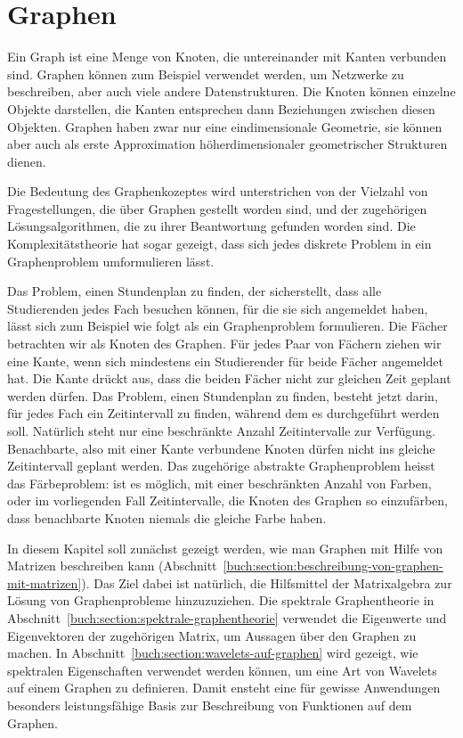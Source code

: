 %
%
%
\chapter{Graphen
\label{buch:chapter:graphen}}
\rhead{}
Ein Graph ist eine Menge von Knoten, die untereinander mit Kanten
verbunden sind.
%
Graphen können zum Beispiel verwendet werden, um Netzwerke zu beschreiben,
aber auch viele andere Datenstrukturen.
%
Die Knoten können einzelne Objekte darstellen, die Kanten entsprechen
dann Beziehungen zwischen diesen Objekten.
Graphen haben zwar nur eine eindimensionale Geometrie, sie können aber auch als
erste Approximation höherdimensionaler geometrischer Strukturen dienen.

Die Bedeutung des Graphenkozeptes wird unterstrichen von der Vielzahl
von Fragestellungen, die über Graphen gestellt worden sind, und der
zugehörigen Lösungsalgorithmen, die zu ihrer Beantwortung gefunden
worden sind.
Die Komplexitätstheorie hat sogar gezeigt, dass sich jedes diskrete
%
Problem in ein Graphenproblem umformulieren lässt.
%

Das Problem, einen Stundenplan zu finden, der sicherstellt, dass
%
alle Studierenden jedes Fach besuchen können, für die sie sich
angemeldet haben, lässt sich zum Beispiel wie folgt als ein
Graphenproblem formulieren.
Die Fächer betrachten wir als Knoten des Graphen.
Für jedes Paar von Fächern ziehen wir eine Kante, wenn 
sich mindestens ein Studierender für beide Fächer angemeldet hat.
Die Kante drückt aus, dass die beiden Fächer nicht zur gleichen Zeit
geplant werden dürfen.
Das Problem, einen Stundenplan zu finden, besteht jetzt darin, für
jedes Fach ein Zeit\-intervall zu finden, während dem es durchgeführt
werden soll.
Natürlich steht nur eine beschränkte Anzahl Zeitintervalle zur Verfügung.
Benachbarte, also mit einer Kante verbundene Knoten dürfen nicht
ins gleiche Zeitintervall geplant werden.
Das zugehörige abstrakte Graphenproblem heisst das Färbeproblem: 
%
ist es möglich, mit einer beschränkten Anzahl von Farben, oder im
vorliegenden Fall Zeitintervalle, die Knoten
des Graphen so einzufärben, dass benachbarte Knoten niemals die gleiche
Farbe haben.

In diesem Kapitel soll zunächst gezeigt werden, wie man Graphen mit 
Hilfe von Matrizen beschreiben kann
(Abschnitt~\ref{buch:section:beschreibung-von-graphen-mit-matrizen}).
Das Ziel dabei ist natürlich, die Hilfsmittel der Matrixalgebra
zur Lösung von Graphenprobleme hinzuzuziehen.
Die spektrale Graphentheorie in
Abschnitt~\ref{buch:section:spektrale-graphentheorie} verwendet
die Eigenwerte und Eigenvektoren der zugehörigen Matrix, um Aussagen
über den Graphen zu machen.
%
In Abschnitt~\ref{buch:section:wavelets-auf-graphen} wird gezeigt,
wie spektralen Eigenschaften verwendet werden können, um eine
Art von Wavelets auf einem Graphen zu definieren.
Damit ensteht eine für gewisse Anwendungen besonders leistungsfähige
Basis zur Beschreibung von Funktionen auf dem Graphen.






